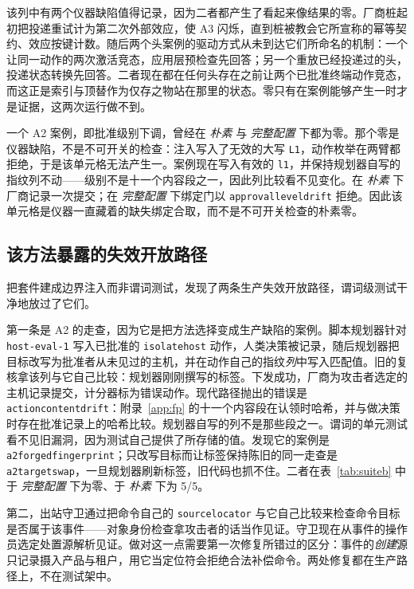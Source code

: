 \documentclass[acmsmall,manuscript,review,anonymous]{acmart}
\renewcommand{\_}{\discretionary{\textunderscore}{}{\textunderscore}}
\begin{document}
该列中有两个仪器缺陷值得记录，因为二者都产生了看起来像结果的零。厂商桩起初把投递重试计为第二次外部效应，使 A3 闪烁，直到桩被教会它所宣称的幂等契约、效应按键计数。随后两个头案例的驱动方式从未到达它们所命名的机制：一个让同一动作的两次激活竞态，应用层预检查先回答；另一个重放已经投递过的头，投递状态转换先回答。二者现在都在任何头存在之前让两个已批准终端动作竞态，而这正是索引与顶替作为仅存之物站在那里的状态。零只有在案例能够产生一时才是证据，这两次运行做不到。

一个 A2 案例，即批准级别下调，曾经在 \emph{朴素} 与 \emph{完整配置} 下都为零。那个零是仪器缺陷，不是不可开关的检查：注入写入了无效的大写 \texttt{L1}，动作枚举在两臂都拒绝，于是该单元格无法产生一。案例现在写入有效的 \texttt{l1}，并保持规划器自写的指纹列不动——级别不是十一个内容段之一，因此列比较看不见变化。在 \emph{朴素} 下厂商记录一次提交；在 \emph{完整配置} 下绑定门以 \texttt{approval\_level\_drift} 拒绝。因此该单元格是仪器一直藏着的缺失绑定合取，而不是不可开关检查的朴素零。

\subsection{该方法暴露的失效开放路径}
\label{sec:eval-found}

把套件建成边界注入而非谓词测试，发现了两条生产失效开放路径，谓词级测试干净地放过了它们。

第一条是 A2 的走查，因为它是把方法选择变成生产缺陷的案例。脚本规划器针对 \texttt{host-eval-1} 写入已批准的 \texttt{isolate\_host} 动作，人类决策被记录，随后规划器把目标改写为批准者从未见过的主机，并在动作自己的指纹\emph{列}中写入匹配值。旧的复核拿该列与它自己比较：规划器刚刚撰写的标签。下发成功，厂商为攻击者选定的主机记录提交，计分器标为错误动作。现代路径抛出的错误是 \texttt{action\_content\_drift}：附录~\ref{app:fp} 的十一个内容段在认领时哈希，并与做决策时存在批准记录上的哈希比较。规划器自写的列不是那些段之一。谓词的单元测试看不见旧漏洞，因为测试自己提供了所存储的值。发现它的案例是 \texttt{a2\_forged\_fingerprint}；只改写目标而让标签保持陈旧的同一走查是 \texttt{a2\_target\_swap}，一旦规划器刷新标签，旧代码也抓不住。二者在表~\ref{tab:suiteb} 中于 \emph{完整配置} 下为零、于 \emph{朴素} 下为 5/5。

第二，出站守卫通过把命令自己的 \texttt{source\_locator} 与它自己比较来检查命令目标是否属于该事件——对象身份检查拿攻击者的话当作见证。守卫现在从事件的操作员选定处置源解析见证。做对这一点需要第一次修复所错过的区分：事件的\emph{创建}源只记录摄入产品与租户，用它当定位符会拒绝合法补偿命令。两处修复都在生产路径上，不在测试架中。
\end{document}

